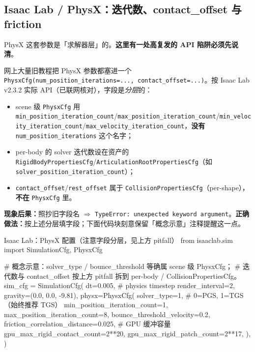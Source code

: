 \subsection{Isaac Lab / PhysX：迭代数、contact\_offset 与 friction}

PhysX 这套参数是「求解器层」的。\textbf{这里有一处高复发的 API 陷阱必须先说清}。

\begin{pitfall}
网上大量旧教程把 PhysX 参数都塞进一个 \verb|PhysxCfg(num_position_iterations=..., contact_offset=...)|。按 Isaac Lab v2.3.2 实际 API（已联网核对），字段是\emph{分层}的：
\begin{itemize}
  \item scene 级 \verb|PhysxCfg| 用 \verb|min_position_iteration_count|/\verb|max_position_iteration_count|/\verb|min_velocity_iteration_count|/\verb|max_velocity_iteration_count|，\textbf{没有} \verb|num_position_iterations| 这个名字；
  \item per-body 的 solver 迭代数设在资产的 \verb|RigidBodyPropertiesCfg|/\verb|ArticulationRootPropertiesCfg|（如 \verb|solver_position_iteration_count|）；
  \item \verb|contact_offset|/\verb|rest_offset| 属于 \verb|CollisionPropertiesCfg|（per-shape），\textbf{不在} \verb|PhysxCfg| 里。
\end{itemize}
\textbf{现象后果：}照抄旧字段名 $\Rightarrow$ \verb|TypeError: unexpected keyword argument|。\textbf{正确做法：}按上述分层填字段；下面代码块刻意保留「概念示意」注释提醒这一点。
\end{pitfall}

\begin{codebox}[Python]{Isaac Lab：PhysX 配置（注意字段分层，见上方 pitfall）}
from isaaclab.sim import SimulationCfg, PhysxCfg

# 概念示意：solver_type / bounce_threshold 等确属 scene 级 PhysxCfg；
# 迭代数与 contact_offset 按上方 pitfall 拆到 per-body / CollisionPropertiesCfg。
sim_cfg = SimulationCfg(
    dt=0.005,                       # physics timestep
    render_interval=2,
    gravity=(0.0, 0.0, -9.81),
    physx=PhysxCfg(
        solver_type=1,              # 0=PGS, 1=TGS（始终推荐 TGS）
        min_position_iteration_count=1,
        max_position_iteration_count=8,
        bounce_threshold_velocity=0.2,
        friction_correlation_distance=0.025,
        # GPU 缓冲容量
        gpu_max_rigid_contact_count=2**20,
        gpu_max_rigid_patch_count=2**17,
    ),
)
\end{codebox}

